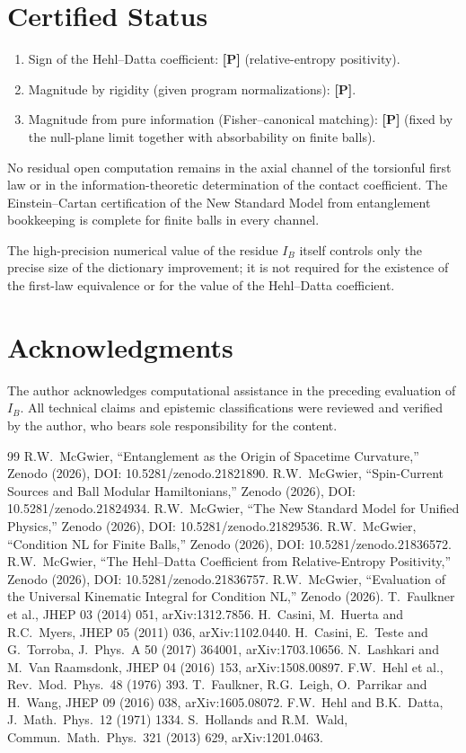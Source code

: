 \documentclass[11pt]{article}
\newcommand{\pP}{\textbf{[P]}}
\begin{document}
\section{Certified Status}
\begin{enumerate}[leftmargin=1.6em]
\item Sign of the Hehl--Datta coefficient: \pP{} (relative-entropy positivity).
\item Magnitude by rigidity (given program normalizations): \pP{}.
\item Magnitude from pure information (Fisher--canonical matching):
\pP{} (fixed by the null-plane limit together with absorbability on
finite balls).
\end{enumerate}
No residual open computation remains in the axial channel of the
torsionful first law or in the information-theoretic determination of
the contact coefficient. The Einstein--Cartan certification of the New
Standard Model from entanglement bookkeeping is complete for finite
balls in every channel.

The high-precision numerical value of the residue $I_B$ itself controls
only the precise size of the dictionary improvement; it is not required
for the existence of the first-law equivalence or for the value of the
Hehl--Datta coefficient.

\section*{Acknowledgments}
The author acknowledges computational assistance in the preceding
evaluation of $I_B$. All technical claims and epistemic classifications
were reviewed and verified by the author, who bears sole responsibility
for the content.

\begin{thebibliography}{99}
 R.W.\ McGwier, ``Entanglement as the Origin of Spacetime Curvature,'' Zenodo (2026), DOI: 10.5281/zenodo.21821890.
 R.W.\ McGwier, ``Spin-Current Sources and Ball Modular Hamiltonians,'' Zenodo (2026), DOI: 10.5281/zenodo.21824934.
 R.W.\ McGwier, ``The New Standard Model for Unified Physics,'' Zenodo (2026), DOI: 10.5281/zenodo.21829536.
 R.W.\ McGwier, ``Condition NL for Finite Balls,'' Zenodo (2026), DOI: 10.5281/zenodo.21836572.
 R.W.\ McGwier, ``The Hehl--Datta Coefficient from Relative-Entropy Positivity,'' Zenodo (2026), DOI: 10.5281/zenodo.21836757.
 R.W.\ McGwier, ``Evaluation of the Universal Kinematic Integral for Condition NL,'' Zenodo (2026).
 T.\ Faulkner et al., JHEP 03 (2014) 051, arXiv:1312.7856.
 H.\ Casini, M.\ Huerta and R.C.\ Myers, JHEP 05 (2011) 036, arXiv:1102.0440.
 H.\ Casini, E.\ Teste and G.\ Torroba, J.\ Phys.\ A 50 (2017) 364001, arXiv:1703.10656.
 N.\ Lashkari and M.\ Van Raamsdonk, JHEP 04 (2016) 153, arXiv:1508.00897.
 F.W.\ Hehl et al., Rev.\ Mod.\ Phys.\ 48 (1976) 393.
 T.\ Faulkner, R.G.\ Leigh, O.\ Parrikar and H.\ Wang, JHEP 09 (2016) 038, arXiv:1605.08072.
 F.W.\ Hehl and B.K.\ Datta, J.\ Math.\ Phys.\ 12 (1971) 1334.
 S.\ Hollands and R.M.\ Wald, Commun.\ Math.\ Phys.\ 321 (2013) 629, arXiv:1201.0463.
\end{thebibliography}
\end{document}
